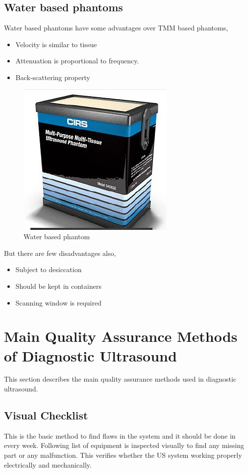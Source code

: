 \documentclass[12pt]{article}
\def \topic{Diagnostic Ultrasound}
\begin{document}
\subsection{Water based phantoms}
Water based phantoms have some advantages over TMM based phantoms,
\begin{itemize}
    \item Velocity is similar to tissue
    \item Attenuation is proportional to frequency.
    \item Back-scattering property
\end{itemize}
\begin{figure}[h!]
    \centering
    \includegraphics[width=0.45\linewidth]{water.jpg}
    \caption{\small{Water based phantom}}
    \label{fig:Water based phantom}
\end{figure}

But there are few disadvantages also,
\begin{itemize}
    \item Subject to desiccation
    \item Should be kept in containers
    \item Scanning window is required
\end{itemize}


\newpage
\pagebreak
\section{Main Quality Assurance Methods of \topic}
This section describes the main quality assurance methods used in diagnostic ultrasound. 

\subsection{Visual Checklist}
This is the basic method to find flaws in the system and it should be done in every week. Following list of equipment is inspected visually to find any missing part or any malfunction. This verifies whether the US system working properly electrically and mechanically. 
\end{document}
